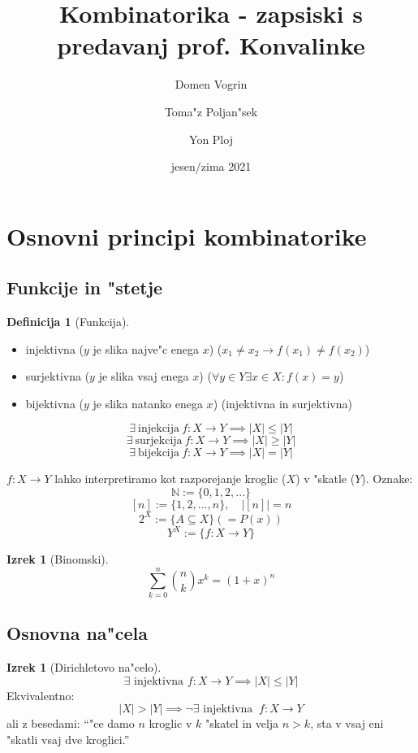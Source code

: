 \documentclass[a4paper,12pt]{article}
\theoremstyle{definition}
\newtheorem{defn}[counter]{Definicija}
\newtheorem{theorem}[counter]{Izrek}
\theoremstyle{remark}
\newcommand{\N}{\mathbb{N}}
\begin{document}
\title{Kombinatorika - zapsiski s predavanj prof. Konvalinke}
\author{
	Domen Vogrin
	\and
	Toma"z Poljan"sek
	\and
	Yon Ploj
}
\date{jesen/zima 2021}
\maketitle


\tableofcontents
\newpage
{}


\section{Osnovni principi kombinatorike}
\subsection{Funkcije in "stetje}

\begin{defn}[Funkcija] \text{}

\begin{itemize}
\item injektivna ($y$ je slika najve"c enega $x$) ($x_1 \neq x_2 \rightarrow f(x_1) \neq f(x_2)$)
\item surjektivna ($y$ je slika vsaj enega $x$) ($\forall y \in Y \exists x \in X:f(x) = y$)
\item bijektivna ($y$ je slika natanko enega $x$) (injektivna in surjektivna)
\end{itemize}
\end{defn}

\[
\exists \ \text{injekcija} \ f: X\rightarrow Y \implies |X|\leqslant |Y|
\]
\[
\exists \ \text{surjekcija} \ f: X\rightarrow Y \implies |X| \geqslant |Y|
\]
\[
\exists \ \text{bijekcija} \ f: X\rightarrow Y \implies |X| = |Y|
\]

$f: X \rightarrow Y$ lahko interpretiramo kot razporejanje kroglic ($X$) v "skatle ($Y$).
Oznake:
\[
\N := \{0, 1, 2, ...\}
\]
\[
[n] := \{1, 2, ..., n\}, \quad |[n]| = n
\]
\[
2^X := \{A\subseteq X\}  (= P(x))
\]
\[
Y^X := \{f: X\rightarrow Y\}
\]

\begin{theorem}[Binomski]
	\[ \sum_{k=0}^{n}\binom{n}{k} x^k = (1+x)^n \]
\end{theorem}


\subsection{Osnovna na"cela}
\begin{theorem}[Dirichletovo na"celo]
	\[
	\exists \text{ injektivna } f: X\rightarrow Y \implies |X| \leqslant |Y|
	\]
	Ekvivalentno:
	\[
	|X| > |Y| \implies \neg \exists \text{ injektivna } \ f: X \rightarrow Y
	\]
	ali z besedami: ``"ce damo $n$ kroglic v $k$ "skatel in velja $n > k$, sta v vsaj eni "skatli vsaj dve kroglici.''
\end{theorem}
\end{document}
